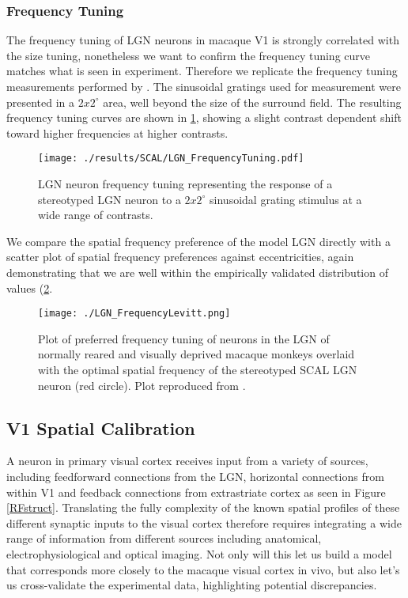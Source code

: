 \subsubsection{Frequency Tuning}

The frequency tuning of LGN neurons in macaque V1 is strongly
correlated with the size tuning, nonetheless we want to confirm the
frequency tuning curve matches what is seen in experiment. Therefore
we replicate the frequency tuning measurements performed by
\cite{Levitt2001}. The sinusoidal gratings used for measurement were
presented in a $2x2^{\circ}$ area, well beyond the size of the
surround field. The resulting frequency tuning curves are shown in
\ref{LGNFrequencyTuning}, showing a slight contrast dependent shift
toward higher frequencies at higher contrasts.

\begin{figure}
	\centering
    \texttt{[image: ./results/SCAL/LGN\_FrequencyTuning.pdf]}
	\caption{LGN neuron frequency tuning representing the response of
      a stereotyped LGN neuron to a $2x2^{\circ}$ sinusoidal grating
      stimulus at a wide range of contrasts.}
	\label{LGNFrequencyTuning}
\end{figure}

We compare the spatial frequency preference of the model LGN directly
with a scatter plot of spatial frequency preferences against
eccentricities, again demonstrating that we are well within the
empirically validated distribution of values
(\ref{LGNFrequencyLevitt}.

\begin{figure}
	\centering
    \texttt{[image: ./LGN\_FrequencyLevitt.png]}
	\caption{Plot of preferred frequency tuning of neurons in the LGN
      of normally reared and visually deprived macaque monkeys
      overlaid with the optimal spatial frequency of the stereotyped
      SCAL LGN neuron (red circle). Plot reproduced from
      \cite{Levitt2001}.}
	\label{LGNFrequencyLevitt}
\end{figure}

\subsection{V1 Spatial Calibration}

A neuron in primary visual cortex receives input from a variety of
sources, including feedforward connections from the LGN, horizontal
connections from within V1 and feedback connections from extrastriate
cortex as seen in Figure \ref{RFstruct}. Translating the fully
complexity of the known spatial profiles of these different synaptic
inputs to the visual cortex therefore requires integrating a wide
range of information from different sources including anatomical,
electrophysiological and optical imaging. Not only will this let us
build a model that corresponds more closely to the macaque visual
cortex in vivo, but also let's us cross-validate the experimental
data, highlighting potential discrepancies.

